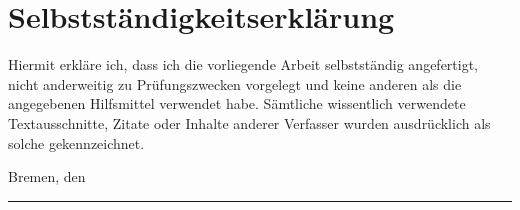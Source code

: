 \section*{Selbstständigkeitserklärung}

Hiermit erkläre ich, dass ich die vorliegende Arbeit selbstständig angefertigt, nicht anderweitig zu
Prüfungszwecken vorgelegt und keine anderen als die angegebenen Hilfsmittel verwendet habe.
Sämtliche wissentlich verwendete Textausschnitte, Zitate oder Inhalte anderer Verfasser wurden
ausdrücklich als solche gekennzeichnet.

Bremen, den \makeatletter\@date\makeatother

\vspace*{1em}
\rule{15em}{0.16667pt}\\
\makeatletter\@author\makeatother
